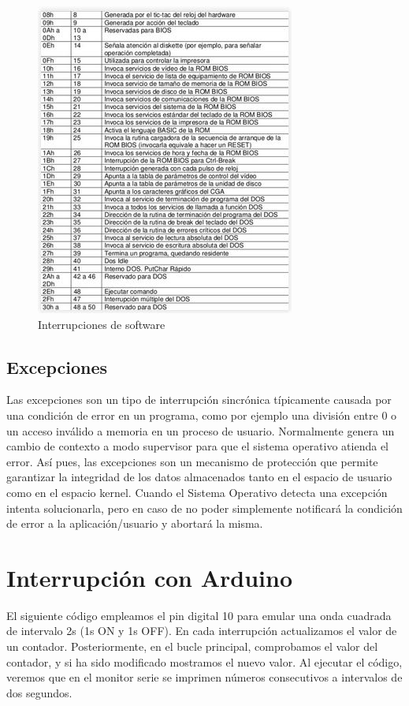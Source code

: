 \documentclass{article}
\begin{document}
\begin{figure}[h]
\centering
\includegraphics[scale=1.2]{interrupciones2}
\caption{Interrupciones de software \cite{interHS}}
\label{fig:interrupciones2}
\end{figure}

\subsection{Excepciones}
Las excepciones son un tipo de interrupción sincrónica típicamente causada por una condición de error en un programa, como por ejemplo una división entre 0 o un acceso inválido a memoria en un proceso de usuario. Normalmente genera un cambio de contexto a modo supervisor para que el sistema operativo atienda el error. Así pues, las excepciones son un mecanismo de protección que permite garantizar la integridad de los datos almacenados tanto en el espacio de usuario como en el espacio kernel. Cuando el Sistema Operativo detecta una excepción intenta solucionarla, pero en caso de no poder simplemente notificará la condición de error a la aplicación/usuario y abortará la misma. 

\section{Interrupción con Arduino}
El siguiente código empleamos el pin digital 10 para emular una onda cuadrada de intervalo 2s (1s ON y 1s OFF).
En cada interrupción actualizamos el valor de un contador. Posteriormente, en el bucle principal, comprobamos el valor del contador, y si ha sido modificado mostramos el nuevo valor.
Al ejecutar el código, veremos que en el monitor serie se imprimen números consecutivos a intervalos de dos segundos.
\end{document}
